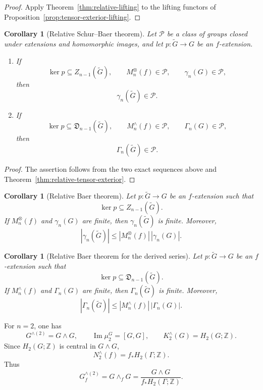 \documentclass[10pt]{amsart}
\newtheorem{corollary}[theorem]{Corollary}
\renewcommand{\*}{\cdot {\dots} \cdot}
\newcommand{\?}[1]{\overset{?}{#1}}
\numberwithin{equation}{section}
\begin{document}
\begin{proof}
Apply Theorem~\ref{thm:relative-lifting} to the lifting
functors of
Proposition~\ref{prop:tensor-exterior-lifting}.
\end{proof}

\begin{corollary}[Relative Schur--Baer theorem]
\label{cor:relative-schur-baer}
Let $\mathcal P$ be a class of groups closed under extensions
and homomorphic images, and let
$p\colon\widetilde G\to G$ be an $f$-extension.

\begin{enumerate}
\item
If
\[
\ker p\subseteq Z_{n-1}(\widetilde G),
\qquad
M_n^{\otimes}(f)\in\mathcal P,
\qquad
\gamma_n(G)\in\mathcal P,
\]
then
\[
\gamma_n(\widetilde G)\in\mathcal P.
\]

\item
If
\[
\ker p\subseteq\mathfrak D_{n-1}(\widetilde G),
\qquad
M_n^{\wedge}(f)\in\mathcal P,
\qquad
\Gamma_n(G)\in\mathcal P,
\]
then
\[
\Gamma_n(\widetilde G)\in\mathcal P.
\]
\end{enumerate}
\end{corollary}

\begin{proof}
The assertion follows from the two exact sequences above and
Theorem~\ref{thm:relative-tensor-exterior}.
\end{proof}

\begin{corollary}[Relative Baer theorem]
\label{cor:relative-baer}
Let $p\colon\widetilde G\to G$ be an $f$-extension such that
\[
\ker p\subseteq Z_{n-1}(\widetilde G).
\]
If $M_n^{\otimes}(f)$ and $\gamma_n(G)$ are finite, then
$\gamma_n(\widetilde G)$ is finite. Moreover,
\[
|\gamma_n(\widetilde G)|
\leq
|M_n^{\otimes}(f)|\,|\gamma_n(G)|.
\]
\end{corollary}

\begin{corollary}[Relative Baer theorem for the derived series]
\label{cor:relative-baer-derived}
Let $p\colon\widetilde G\to G$ be an $f$-extension such that
\[
\ker p\subseteq\mathfrak D_{n-1}(\widetilde G).
\]
If $M_n^{\wedge}(f)$ and $\Gamma_n(G)$ are finite, then
$\Gamma_n(\widetilde G)$ is finite. Moreover,
\[
|\Gamma_n(\widetilde G)|
\leq
|M_n^{\wedge}(f)|\,|\Gamma_n(G)|.
\]
\end{corollary}

For $n=2$, one has
\[
G^{\wedge(2)}=G\wedge G,
\qquad
\operatorname{Im}\mu_2^G=[G,G],
\qquad
K_2^{\wedge}(G)=H_2(G;\mathbb Z).
\]
Since $H_2(G;\mathbb Z)$ is central in $G\wedge G$,
\[
N_2^{\wedge}(f)=f_*H_2(\Gamma;\mathbb Z).
\]
Thus
\[
G_f^{\wedge(2)}
=G\wedge_fG
=\frac{G\wedge G}{f_*H_2(\Gamma;\mathbb Z)}.
\]
\end{document}
